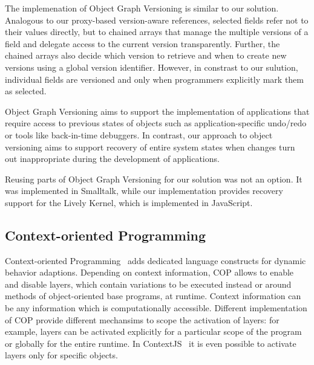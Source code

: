 The implemenation of Object Graph Versioning is similar to our solution.
Analogous to our proxy-based version-aware references, selected fields refer not to their values directly, but to chained arrays that manage the multiple versions of a field and delegate access to the current version transparently.
Further, the chained arrays also decide which version to retrieve and when to create new versions using a global version identifier.
However, in constrast to our sulution, individual fields are versioned and only when programmers explicitly mark them as selected.

Object Graph Versioning aims to support the implementation of applications that require access to previous states of objects such as application-specific undo/redo or tools like back-in-time debuggers.
In contrast, our approach to object versioning aims to support recovery of entire system states when changes turn out inappropriate during the development of applications.

Reusing parts of Object Graph Versioning for our solution was not an option.
It was implemented in Smalltalk, while our implementation provides recovery support for the Lively Kernel, which is implemented in JavaScript.


\subsection{Context-oriented Programming}

Context-oriented Programming~\cite{Hirschfeld2008COP} adds dedicated language constructs for dynamic behavior adaptions.
Depending on context information, COP allows to enable and disable layers, which contain variations to be executed instead or around methods of object-oriented base programs, at runtime.
Context information can be any information which is computationally accessible.
Different implementation of COP provide different mechansims to scope the activation of layers: for example, layers can be activated explicitly for a particular scope of the program or globally for the entire runtime.
In ContextJS~\cite{Lincke2011OIC} it is even possible to activate layers only for specific objects.

